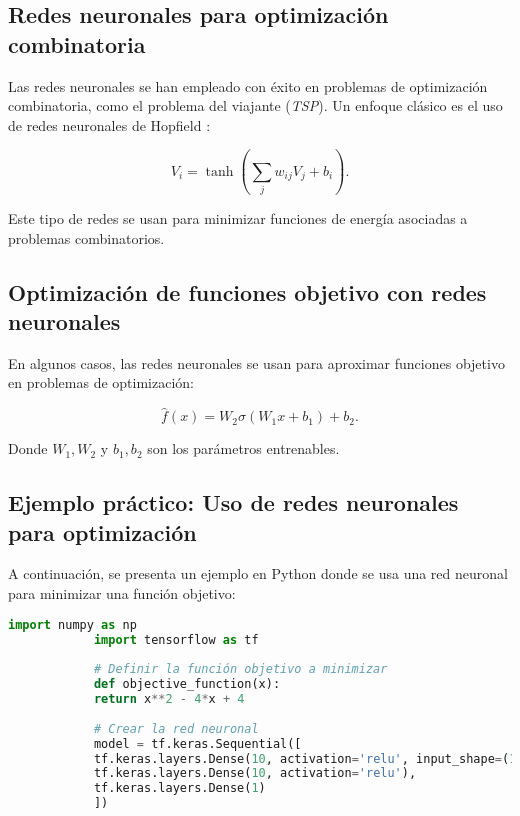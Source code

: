 \begin{itemize}
		\subsection{Redes neuronales para optimización combinatoria}
		
		Las redes neuronales se han empleado con éxito en problemas de optimización combinatoria, como el problema del viajante (\textit{TSP}). Un enfoque clásico es el uso de redes neuronales de Hopfield \cite{hopfield1985neural}:
		
		\begin{equation}
			V_i = \tanh\left( \sum_j w_{ij} V_j + b_i \right).
		\end{equation}
		
		Este tipo de redes se usan para minimizar funciones de energía asociadas a problemas combinatorios.
		
		\subsection{Optimización de funciones objetivo con redes neuronales}
		
		En algunos casos, las redes neuronales se usan para aproximar funciones objetivo en problemas de optimización:
		
		\begin{equation}
			\hat{f}(x) = W_2 \sigma(W_1 x + b_1) + b_2.
		\end{equation}
		
		Donde \( W_1, W_2 \) y \( b_1, b_2 \) son los parámetros entrenables.
		
		\subsection{Ejemplo práctico: Uso de redes neuronales para optimización}
		
		A continuación, se presenta un ejemplo en Python donde se usa una red neuronal para minimizar una función objetivo:
		
		\begin{lstlisting}[language=Python, caption={Optimización de una función con una red neuronal en TensorFlow}]
			import numpy as np
			import tensorflow as tf
			
			# Definir la función objetivo a minimizar
			def objective_function(x):
			return x**2 - 4*x + 4
			
			# Crear la red neuronal
			model = tf.keras.Sequential([
			tf.keras.layers.Dense(10, activation='relu', input_shape=(1,)),
			tf.keras.layers.Dense(10, activation='relu'),
			tf.keras.layers.Dense(1)
			])
			

\end{lstlisting}
\end{itemize}

